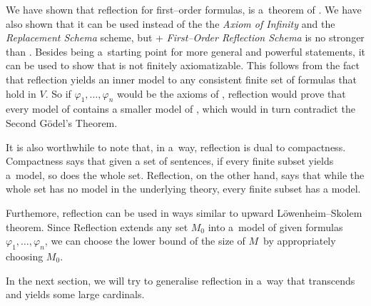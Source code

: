 We have shown that reflection for first–order formulas, is a~theorem of . %
We have also shown that it can be used instead of the the \emph{Axiom of Infinity} and the \emph{Replacement Schema} scheme, but  + \emph{First–Order Reflection Schema} is no stronger than . 
Besides being a~starting point for more general and powerful statements, it can be used to show that  is not finitely axiomatizable. 
This follows from the fact that reflection yields an inner model to any consistent finite set of formulas that hold in $V$.
So if $\varphi_1, \ldots, \varphi_n$ would be the axioms of , reflection would prove that every model of  contains a smaller model of , which would in turn contradict the Second Gödel's Theorem. %

It is also worthwhile to note that, in a~way, reflection is dual to compactness. 
Compactness says that given a set of sentences, if every finite subset yields a~model, so does the whole set. Reflection, on the other hand, says that while the whole set has no model in the underlying theory, every finite subset has a model.

Furthemore, reflection can be used in ways similar to upward Löwenheim–Skolem theorem.
Since Reflection extends any set $M_0$ into a~model of given formulas $\varphi_1, \ldots, \varphi_n$, we can choose the lower bound of the size of $M$ by appropriately choosing $M_0$.

In the next section, we will try to generalise reflection in a~way that transcends  and yields some large cardinals.
\newpage
